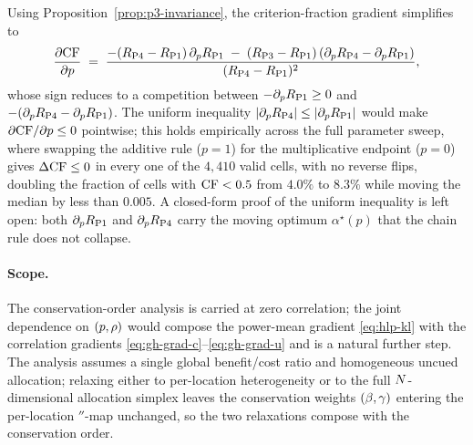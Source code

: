Using Proposition~\ref{prop:p3-invariance}, the criterion-fraction
gradient simplifies to
\begin{equation*}
  \frac{\partial \mathrm{CF}}{\partial p}
  \;=\;
  \frac{-(R_{\mathrm{P4}} - R_{\mathrm{P1}})\,\partial_p R_{\mathrm{P1}}
        \;-\; (R_{\mathrm{P3}} - R_{\mathrm{P1}})\,(\partial_p R_{\mathrm{P4}} - \partial_p R_{\mathrm{P1}})}
       {(R_{\mathrm{P4}} - R_{\mathrm{P1}})^2},
\end{equation*}
whose sign reduces to a competition between $-\partial_p R_{\mathrm{P1}} \ge 0$
and $-(\partial_p R_{\mathrm{P4}} - \partial_p R_{\mathrm{P1}})$. The uniform inequality
$|\partial_p R_{\mathrm{P4}}| \le |\partial_p R_{\mathrm{P1}}|$ would make
$\partial \mathrm{CF}/\partial p \le 0$ pointwise; this holds empirically across
the full parameter sweep, where swapping the additive rule ($p = 1$) for
the multiplicative endpoint ($p = 0$) gives $\Delta\mathrm{CF} \le 0$ in every
one of the $4{,}410$ valid cells, with no reverse flips, doubling the
fraction of cells with $\mathrm{CF} < 0.5$ from $4.0\%$ to $8.3\%$ while moving
the median by less than $0.005$. A closed-form proof of the uniform
inequality is left open: both $\partial_p R_{\mathrm{P1}}$ and
$\partial_p R_{\mathrm{P4}}$ carry the moving optimum $\alpha^\star(p)$ that
the chain rule does not collapse.

\paragraph{Scope.}
The conservation-order analysis is carried at zero correlation; the
joint dependence on $(p, \rho)$ would compose the power-mean gradient
\eqref{eq:hlp-kl} with the correlation gradients
\eqref{eq:gh-grad-c}--\eqref{eq:gh-grad-u} and is a natural further step.
The analysis assumes a single global benefit/cost ratio and homogeneous
uncued allocation; relaxing either to per-location heterogeneity or to
the full $N$-dimensional allocation simplex leaves the
conservation weights $(\beta, \gamma)$ entering the per-location
$\dprime$-map unchanged, so the two relaxations compose with the
conservation order.
